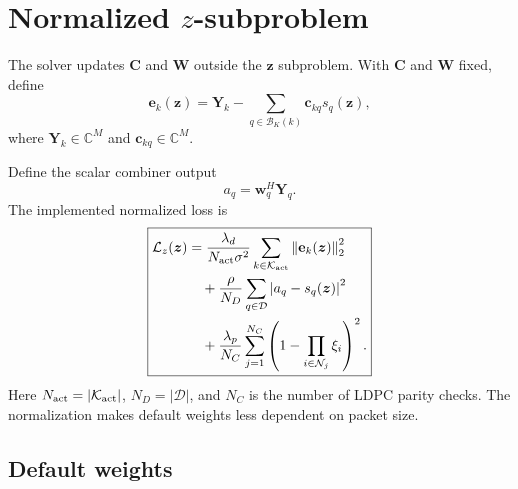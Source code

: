 \documentclass[11pt]{article}
\newcommand{\C}{\mathbb{C}}
\newcommand{\norm}[1]{\left\lVert #1 \right\rVert}
\newcommand{\abs}[1]{\left\lvert #1 \right\rvert}
\begin{document}
\section{Normalized $z$-subproblem}
\label{sec:z-subproblem}

The solver updates $\mathbf C$ and $\mathbf W$ outside the $\bm z$ subproblem.  With $\mathbf C$ and $\mathbf W$ fixed, define
\begin{equation}
\mathbf e_k(\bm z)
=\mathbf Y_k-\sum_{q\in\mathcal B_K(k)}\mathbf c_{kq}s_q(\bm z),
\end{equation}
where $\mathbf Y_k\in\C^M$ and $\mathbf c_{kq}\in\C^M$.

Define the scalar combiner output
\begin{equation}
 a_q=\mathbf w_q^H\mathbf Y_q.
\end{equation}
The implemented normalized loss is
\begin{equation}
\boxed{
\begin{aligned}
\mathcal L_z(\bm z)
&=\frac{\lambda_d}{N_{\rm act}\sigma^2}
\sum_{k\in\mathcal K_{\rm act}}
\norm{\mathbf e_k(\bm z)}_2^2 \\
&\quad +\frac{\rho}{N_D}
\sum_{q\in\mathcal D}
\abs{a_q-s_q(\bm z)}^2 \\
&\quad +\frac{\lambda_p}{N_C}
\sum_{j=1}^{N_C}
\left(1-\prod_{i\in\mathcal N_j}\xi_i\right)^2.
\end{aligned}}
\label{eq:lz}
\end{equation}
Here $N_{\rm act}=|\mathcal K_{\rm act}|$, $N_D=|\mathcal D|$, and $N_C$ is the number of LDPC parity checks.  The normalization makes default weights less dependent on packet size.

\subsection{Default weights}
\end{document}
